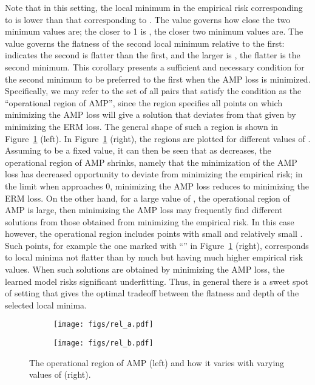 \documentclass[final]{cvpr}
\begin{document}
Note that in this setting, the local minimum in the empirical risk corresponding to  is lower than that corresponding to . The value  governs how close the two minimum values are; the closer to 1 is , the closer two minimum values are. The value  governs the flatness of the second local minimum relative to the first:  indicates the second is flatter than the first, and the larger is , the flatter is the second minimum. This corollary presents a sufficient and necessary condition for the second minimum to be preferred to the first when the AMP loss is minimized. Specifically, we may refer to the set of all  pairs that satisfy the condition as the ``operational region of AMP'', since the region specifies all points on which minimizing the AMP loss will give a solution that deviates from that given by minimizing the ERM loss. The general shape of such a region is shown in Figure~\ref{fig:rel} (left). In Figure~\ref{fig:rel} (right), the regions are plotted for different values of . Assuming  to be a fixed value, it can then be seen that as  decreases, the operational region of AMP shrinks, namely that the minimization of the AMP loss has decreased opportunity to deviate from minimizing the empirical risk; in the limit when  approaches 0, minimizing the AMP loss reduces to minimizing the ERM loss. On the other hand, for a large value of , the operational region of AMP is large, then minimizing the AMP loss may frequently find different solutions from those obtained from minimizing the empirical risk.  In this case however, the operational region includes points  with small  and relatively small . Such points, for example the one marked with ``'' in Figure~\ref{fig:rel} (right), corresponds to local minima not flatter than  by much but having much higher empirical risk values. When such solutions are obtained by minimizing the AMP loss, the learned model risks significant underfitting. Thus, in general there is a sweet spot of  setting that gives the optimal tradeoff between the flatness and depth of the selected local minima.

\begin{figure}[t]
\centering
\begin{subfigure}{0.49\columnwidth}\centering \texttt{[image: figs/rel\_a.pdf]}\end{subfigure}\begin{subfigure}{0.49\columnwidth}\centering \texttt{[image: figs/rel\_b.pdf]}\end{subfigure}\caption{The operational region of AMP (left) and how it varies with varying values of  (right).}
\label{fig:rel}
\end{figure}
\end{document}

